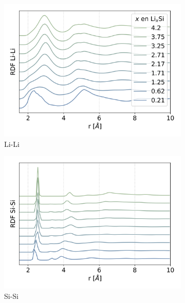 \begin{figure}[h!]
    \centering
    \begin{subfigure}{.475\textwidth}
        \centering
        \includegraphics[width=\textwidth]{caracterizacion/resultados/rdf/rdf-LiLi.png}
        \caption{Li-Li}
        \label{fig:rdf-LiLi}
    \end{subfigure}
    \begin{subfigure}{.475\textwidth}
        \centering
        \includegraphics[width=\textwidth]{caracterizacion/resultados/rdf/rdf-SiSi.png}
        \caption{Si-Si}
        \label{fig:rdf-SiSi}
    \end{subfigure}
    \begin{subfigure}{.475\textwidth}

\end{subfigure}
\end{figure}
